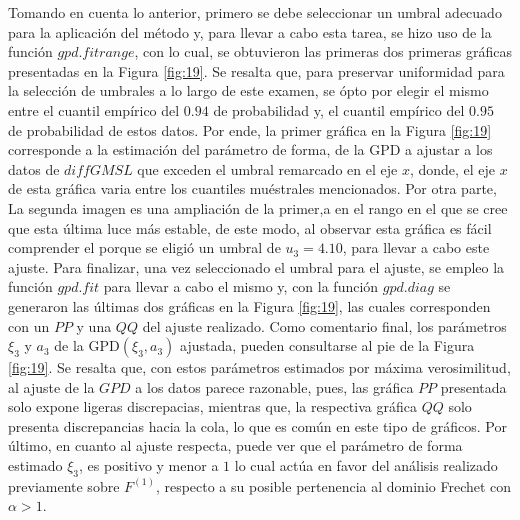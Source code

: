 \documentclass[10.5pt,notitlepage]{article}
\theoremstyle{plain}
\begin{document}
Tomando en cuenta lo anterior, primero se debe seleccionar un umbral adecuado para la aplicación del método y, para llevar a cabo esta tarea, se hizo uso de la función \(gpd.fitrange\), con lo cual, se obtuvieron las primeras dos primeras gráficas presentadas en la Figura \ref{fig:19}. Se resalta que, para preservar uniformidad para la selección de umbrales a lo largo de este examen, se ópto por elegir el mismo entre el cuantil empírico del \(0.94\) de probabilidad y, el cuantil empírico del \(0.95\) de probabilidad de estos datos. Por ende, la primer gráfica en la Figura \ref{fig:19} corresponde a la estimación del parámetro de forma, de la GPD a ajustar a los datos de \(diffGMSL\) que exceden el umbral remarcado en el eje \(x\), donde, el eje \(x\) de esta gráfica varia entre los cuantiles muéstrales mencionados. Por otra parte, La segunda imagen es una ampliación de la primer,a en el rango en el que se cree que esta última luce más estable, de este modo, al observar esta gráfica es fácil comprender el porque se eligió un umbral de \(u_3 = 4.10\), para llevar a cabo este ajuste. Para finalizar, una vez seleccionado el umbral para el ajuste, se empleo la función \(gpd.fit\) para llevar a cabo el mismo y, con la función \(gpd.diag\) se generaron las últimas dos gráficas en la Figura \ref{fig:19}, las cuales corresponden con un \(PP\) y una \(QQ\) del ajuste realizado. Como comentario final, los parámetros \(\xi_3\) y \(a_3\) de la GPD\((\xi_3,a_3)\) ajustada, pueden consultarse al pie de la Figura \ref{fig:19}. Se resalta que, con estos parámetros estimados por máxima verosimilitud, al ajuste de la \(GPD\) a los datos parece razonable, pues, las gráfica \(PP\) presentada solo expone ligeras discrepacias, mientras que, la respectiva gráfica \(QQ\) solo presenta discrepancias hacia la cola, lo que es común en este tipo de gráficos. Por último, en cuanto al ajuste respecta, puede ver que el parámetro de forma estimado \(\xi_3\), es positivo y menor a \(1\) lo cual actúa en favor del análisis realizado previamente sobre \(F^{(1)}\), respecto a su posible pertenencia al dominio Frechet con \(\alpha > 1\).
\end{document}

